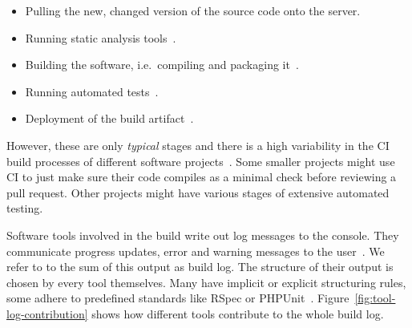 \documentclass[\myrootdir/main.tex]{subfiles}
\begin{document}
\begin{itemize}
	\item Pulling the new, changed version of the source code onto the server.
	\item Running static analysis tools~\cite{zampetti2017open}.
	\item Building the software, i.e.\ compiling and packaging it~\cite{phillips2014understanding}.
	\item Running automated tests~\cite{beller2017oops}.
	\item Deployment of the build artifact~\cite{schermann2016empirical}.
\end{itemize}

However, these are only \emph{typical} stages and there is a high variability in the CI build processes of different software projects~\cite{staahl2014modeling}.
Some smaller projects might use CI to just make sure their code compiles as a minimal check before reviewing a pull request.
Other projects might have various stages of extensive automated testing.

Software tools involved in the build write out log messages to the console.
They communicate progress updates, error and warning messages to the user~\cite{yuan2012characterizing}.
We refer to to the sum of this output as build log.
The structure of their output is chosen by every tool themselves.
Many have implicit or explicit structuring rules, some adhere to predefined standards like RSpec or PHPUnit~\cite{phpunit2019logging,rspec2019format}.
Figure~\ref{fig:tool-log-contribution} shows how different tools contribute to the whole build log.
\end{document}

